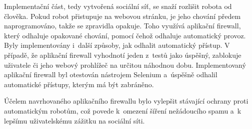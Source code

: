 Implementační část, tedy vytvořená sociální síť, se snaží rozlišit robota od člověka. Pokud robot přistupuje na webovou stránku, je jeho chování předem naprogramováno, takže se zpravidla opakuje. Toho využívá aplikační firewall, který odhaluje opakované chování, pomocí čehož odhaluje automatický provoz. Byly implementovány i~další způsoby, jak odhalit automatický přístup. V případě, že aplikační firewall vyhodnotí jeden z~testů jako úspěšný, zablokuje uživatele či jeho webový prohlížeč na určitou náhodnou dobu. Implementovaný aplikační firewall byl otestován nástrojem Selenium a~úspěšně odhalil automatické přístupy, kterým má být zabráněno.

Účelem navrhovaného aplikačního firewallu bylo vylepšit stávající ochrany proti automatickým robotům, což povede k~omezení šíření nežádoucího spamu a~k lepšímu uživatelskému zážitku na sociální síti.
